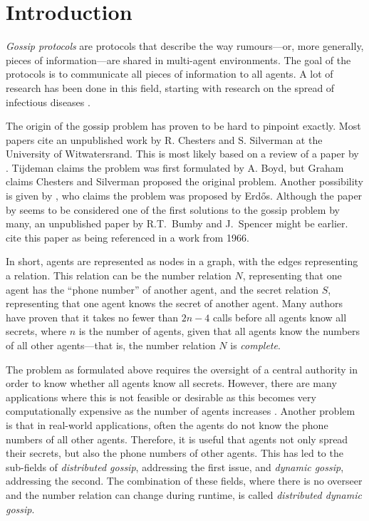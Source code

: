 
\section{Introduction}
\label{sec:introduction}

\textit{Gossip protocols} are protocols that describe the way rumours---or, more generally, pieces of information---are shared in multi-agent environments.
The goal of the protocols is to communicate all pieces of information to all agents.
A lot of research has been done in this field, 
starting with research on the spread of infectious diseases \parencite{kermack_contribution_1927}.

The origin of the gossip problem has proven to be hard to pinpoint exactly.
Most papers cite an unpublished work by R. Chesters and S. Silverman at the University of Witwatersrand.
This is most likely based on a review \parencite{graham_review_1972} of a paper by \textcite{tijdeman_telephone_1971}.
Tijdeman claims the problem was first formulated by A. Boyd, but Graham claims Chesters and Silverman proposed the original problem.
Another possibility is given by \textcite{lebensold_efficient_1973}, who claims the problem was proposed by Erd\H{o}s.
Although the paper by \citeauthor{tijdeman_telephone_1971} seems to be considered one of the first solutions to the gossip problem by many,
an unpublished paper by R.T.~Bumby and J.~Spencer might be earlier. 
\textcite{harary_communication_1974} cite this paper as being referenced in a work from 1966.

In short, agents are represented as nodes in a graph, with the edges representing a relation.
This relation can be the number relation \(N\), representing that one agent has the ``phone number'' of another agent,
and the secret relation \(S\), representing that one agent knows the secret of another agent.
Many authors \parencite[e.g.,][]{tijdeman_telephone_1971, hajnal_cure_1972, baker_gossips_1972, lebensold_efficient_1973} have proven that it takes no fewer than \(2n-4\) calls before all agents know all secrets,
where \(n\) is the number of agents,
given that all agents know the numbers of all other agents---that is, the number relation \(N\) is \textit{complete}.

The problem as formulated above requires the oversight of a central authority in order to know whether all agents know all secrets.
However, there are many applications where this is not feasible or desirable as this becomes very computationally expensive as the number of agents increases \parencite{kermarrec_gossiping_2007}.
Another problem is that in real-world applications, often the agents do not know the phone numbers of all other agents. 
Therefore, it is useful that agents not only spread their secrets, but also the phone numbers of other agents.
This has led to the sub-fields of \textit{distributed gossip}, addressing the first issue, and \textit{dynamic gossip}, addressing the second.
The combination of these fields, where there is no overseer and the number relation can change during runtime, is called \textit{distributed dynamic gossip}.

